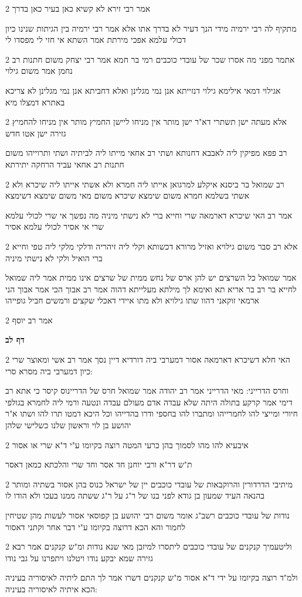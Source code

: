 \documentclass[12pt, openany]{book}
\newcommand{\sethebfont}{
\fontsize{10.5pt}{21.0pt} \selectfont
}
\newcommand{\twocol}[1]{
	{\sethebfont \begin{multicols}{2}
			#1
	\end{multicols}}	
}
\newcommand{\sectname}{}
\newcommand{\newsection}[1]{
	\addcontentsline{toc}{section}{#1}
	\renewcommand{\sectname}{#1}	
	\vspace{-\baselineskip}
	\begin{center}
		\textbf{%
\fontsize{16pt}{16pt}\selectfont
			#1}
	\end{center}
	\vspace{-\baselineskip}
	\nopagebreak
}
\begin{document}
\twocol{אמר רבי זירא לא קשיא כאן בעיר כאן בדרך
\par מתקיף לה רבי ירמיה מידי הנך דעיר לא בדרך אתו אלא אמר רבי ירמיה בין הגיתות שנינו כיון דכולי עלמא אפכי מירתת אמר השתא אי חזי לי מפסדו לי}
\twocol{אתמר מפני מה אסרו שכר של עובדי כוכבים רמי בר חמא אמר רבי יצחק משום חתנות רב נחמן אמר משום גילוי
\par אגילוי דמאי אילימא גילוי דנזייתא אנן נמי מגלינן ואלא דחביתא אנן נמי מגלינן לא צריכא באתרא דמצלו מיא}
\twocol{אלא מעתה ישן תשתרי דא"ר ישן מותר אין מניחו ליישן החמיץ מותר אין מניחו להחמיץ גזירה ישן אטו חדש
\par רב פפא מפיקין ליה לאבבא דחנותא ושתי רב אחאי מייתו ליה לביתיה ושתי ותרוייהו משום חתנות רב אחאי עביד הרחקה יתירתא}
\twocol{רב שמואל בר ביסנא איקלע למרגואן אייתו ליה חמרא ולא אשתי אייתו ליה שיכרא ולא אשתי בשלמא חמרא משום שימצא שיכרא משום מאי משום שימצא דשימצא
\par אמר רב האי שיכרא דארמאה שרי וחייא ברי לא נישתי מיניה מה נפשך אי שרי לכולי עלמא שרי אי אסיר לכולי עלמא אסיר}
\twocol{אלא רב סבר משום גילויא ואזיל מרורא דכשותא וקלי ליה זיהריה ודלקי מלקי ליה טפי וחייא ברי הואיל ולקי לא נישתי מיניה
\par אמר שמואל כל השרצים יש להן ארס של נחש ממית של שרצים אינו ממית אמר ליה שמואל לחייא בר רב בר אריא תא ואימא לך מילתא מעלייתא דהוה אמר רב אבוך הכי אמר אבוך הני ארמאי זוקאני דהוו שתו גילויא ולא מתו איידי דאכלי שקצים ורמשים חביל גופייהו}
\twocol{אמר רב יוסף}
\newsection{דף לב}
\twocol{האי חלא דשיכרא דארמאה אסור דמערבי ביה דורדיא דיין נסך אמר רב אשי ומאוצר שרי כיון דמערבי ביה מסרא סרי:
\par וחרס הדרייני: מאי הדרייני אמר רב יהודה אמר שמואל חרס של הדריינוס קיסר כי אתא רב דימי אמר קרקע בתולה היתה שלא עבדה אדם מעולם עבדה ונטעה ורמי ליה לחמרא בגולפי חיורי ומייצי להו לחמרייהו ומתברו להו בחספי ודרו בהדייהו וכל היכא דמטו תרו להו ושתו א"ר יהושע בן לוי וראשון שלנו כשלישי שלהן}
\twocol{איבעיא להו מהו לסמוך בהן כרעי המטה רוצה בקיומו ע"י ד"א שרי או אסור
\par ת"ש דר"א ורבי יוחנן חד אסר וחד שרי והלכתא כמאן דאסר}
\twocol{מיתיבי הדרדורין והרוקבאות של עובדי כוכבים יין של ישראל כנוס בהן אסור בשתיה ומותר בהנאה העיד שמעון בן גודא לפני בנו של ר"ג על ר"ג ששתה ממנו בעכו ולא הודו לו
\par נודות של עובדי כוכבים רשב"ג אומר משום רבי יהושע בן קפוסאי אסור לעשות מהן שטיחין לחמור והא הכא דרוצה בקיומו ע"י דבר אחר וקתני דאסור}
\twocol{וליטעמיך קנקנים של עובדי כוכבים ליתסרו למיזבן מאי שנא נודות ומ"ש קנקנים אמר רבא גזירה שמא יבקע נודו ויטלנו ויתפרנו על גבי נודו
\par ולמ"ד רוצה בקיומו על ידי ד"א אסור מ"ש קנקנים דשרו אמר לך התם ליתיה לאיסוריה בעיניה הכא איתיה לאיסוריה בעיניה:}
\end{document}
